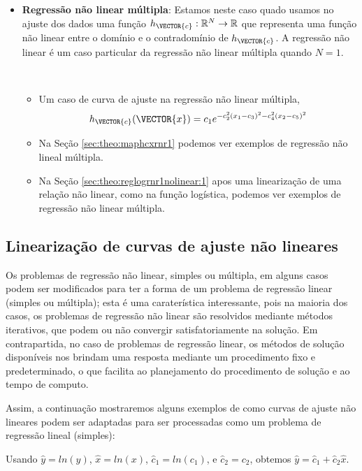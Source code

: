 \begin{itemize}
\item \textbf{Regressão não linear múltipla}: 
Estamos neste caso quado usamos no ajuste dos dados
uma função $h_{\VECTOR{c}}:\mathbb{R}^{N} \rightarrow \mathbb{R}$ 
que representa uma função não linear entre o domínio e o contradomínio de $h_{\VECTOR{c}}$.
A regressão não linear é um caso particular da regressão não linear múltipla quando $N=1$.
\begin{example}~
\begin{itemize}
\item Um caso de curva de ajuste na regressão não linear múltipla, 
\begin{equation}
h_{\VECTOR{c}}(\VECTOR{x})=c_1 e^{- c_2^2(x_1 -c_3)^2- c_4^2(x_2 -c_5)^2}
\end{equation}
\item Na Seção \ref{sec:theo:maphcxrnr1} podemos ver exemplos de regressão não lineal múltipla.
\item Na Seção \ref{sec:theo:reglogrnr1nolinear:1} apos uma linearização de uma relação não linear,
como na função logística, podemos ver exemplos de regressão não linear múltipla.
\end{itemize}
\end{example}
\end{itemize}

\subsection{Linearização de curvas de ajuste não lineares}

Os problemas de regressão não linear, simples ou múltipla,
em alguns casos podem ser modificados para ter a forma de um 
problema de regressão linear (simples ou múltipla);
esta é uma caraterística interessante, pois na maioria dos casos,
os problemas de regressão não linear são resolvidos mediante métodos iterativos,
que podem ou não convergir satisfatoriamente na solução.
Em contrapartida, no caso de problemas de regressão linear,
os métodos de solução disponíveis nos brindam uma resposta mediante um procedimento 
fixo e predeterminado, 
o que facilita ao planejamento do procedimento de solução e ao tempo de computo.

Assim, a continuação mostraremos alguns exemplos de
como curvas de ajuste não lineares podem ser 
adaptadas para ser processadas como um problema de regressão lineal (simples):
\begin{example}[Curva de ajuste 
$y=c_1x^{c_2}$:] 
Usando 
$\hat{y}=ln(y)$,  
$\hat{x}=ln(x)$, 
$\hat{c}_1=ln(c_1)$, e
$\hat{c}_2=c_2$, obtemos $\hat{y}=\hat{c}_1+\hat{c}_2 \hat{x}$.
\end{example}

